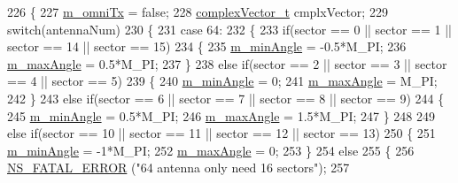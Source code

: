 \begin{DoxyCode}
226 \{
227         \hyperlink{classns3_1_1AntennaArrayModel_aba61876be2ce48b14eda6aa791c15c39}{m\_omniTx} = \textcolor{keyword}{false};
228         \hyperlink{namespacens3_a6a7f75817ae50e6ac47414955b17d926}{complexVector\_t} cmplxVector;
229         \textcolor{keywordflow}{switch}(antennaNum)
230         \{
231                 \textcolor{keywordflow}{case} 64:
232                 \{
233                         \textcolor{keywordflow}{if}(sector == 0 || sector == 1 || sector == 14 || sector == 15)
234                         \{
235                                 \hyperlink{classns3_1_1AntennaArrayModel_a07697f3127921e2f89bbd4250a9ef731}{m\_minAngle} = -0.5*M\_PI;
236                                 \hyperlink{classns3_1_1AntennaArrayModel_a26e13d2c83e29ce7d13d6dec94131589}{m\_maxAngle} = 0.5*M\_PI;
237                         \}
238                         \textcolor{keywordflow}{else} \textcolor{keywordflow}{if}(sector == 2 || sector == 3 || sector == 4 || sector == 5)
239                         \{
240                                 \hyperlink{classns3_1_1AntennaArrayModel_a07697f3127921e2f89bbd4250a9ef731}{m\_minAngle} = 0;
241                                 \hyperlink{classns3_1_1AntennaArrayModel_a26e13d2c83e29ce7d13d6dec94131589}{m\_maxAngle} = M\_PI;
242                         \}
243                         \textcolor{keywordflow}{else} \textcolor{keywordflow}{if}(sector == 6 || sector == 7 || sector == 8 || sector == 9)
244                         \{
245                                 \hyperlink{classns3_1_1AntennaArrayModel_a07697f3127921e2f89bbd4250a9ef731}{m\_minAngle} = 0.5*M\_PI;
246                                 \hyperlink{classns3_1_1AntennaArrayModel_a26e13d2c83e29ce7d13d6dec94131589}{m\_maxAngle} = 1.5*M\_PI;
247                         \}
248 
249                         \textcolor{keywordflow}{else} \textcolor{keywordflow}{if}(sector == 10 || sector == 11 || sector == 12 || sector == 13)
250                         \{
251                                 \hyperlink{classns3_1_1AntennaArrayModel_a07697f3127921e2f89bbd4250a9ef731}{m\_minAngle} = -1*M\_PI;
252                                 \hyperlink{classns3_1_1AntennaArrayModel_a26e13d2c83e29ce7d13d6dec94131589}{m\_maxAngle} = 0;
253                         \}
254                         \textcolor{keywordflow}{else}
255                         \{
256                                 \hyperlink{group__fatal_ga5131d5e3f75d7d4cbfd706ac456fdc85}{NS\_FATAL\_ERROR} (\textcolor{stringliteral}{"64 antenna only need 16 sectors"});
257 

\end{DoxyCode}

